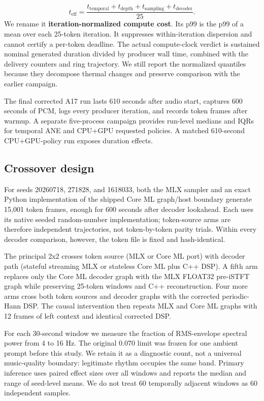 \documentclass[10pt]{article}
\begin{document}
\[t_{\mathrm{eff}} = \frac{t_{\mathrm{temporal}} + t_{\mathrm{depth}} + t_{\mathrm{sampling}} + t_{\mathrm{decoder}}}{25}.\]
We rename it \textbf{iteration-normalized compute cost}. Its p99 is the p99 of a mean over each 25-token iteration. It suppresses within-iteration dispersion and cannot certify a per-token deadline. The actual compute-clock verdict is sustained nominal generated duration divided by producer wall time, combined with the delivery counters and ring trajectory. We still report the normalized quantiles because they decompose thermal changes and preserve comparison with the earlier campaign.

The final corrected A17 run lasts 610 seconds after audio start, captures 600 seconds of PCM, logs every producer iteration, and records token frames after warmup. A separate five-process campaign provides run-level medians and IQRs for temporal ANE and CPU+GPU requested policies. A matched 610-second CPU+GPU-policy run exposes duration effects.

\subsection{Crossover design}
For seeds 20260718, 271828, and 1618033, both the MLX sampler and an exact Python implementation of the shipped Core ML graph/host boundary generate 15,001 token frames, enough for 600 seconds after decoder lookahead. Each uses its native seeded random-number implementation; token-source arms are therefore independent trajectories, not token-by-token parity trials. Within every decoder comparison, however, the token file is fixed and hash-identical.

The principal 2x2 crosses token source (MLX or Core ML port) with decoder path (stateful streaming MLX or stateless Core ML plus C++ DSP). A fifth arm replaces only the Core ML decoder graph with the MLX FLOAT32 pre-iSTFT graph while preserving 25-token windows and C++ reconstruction. Four more arms cross both token sources and decoder graphs with the corrected periodic-Hann DSP. The causal intervention then repeats MLX and Core ML graphs with 12 frames of left context and identical corrected DSP.

For each 30-second window we measure the fraction of RMS-envelope spectral power from 4 to 16 Hz. The original 0.070 limit was frozen for one ambient prompt before this study. We retain it as a diagnostic count, not a universal music-quality boundary: legitimate rhythm occupies the same band. Primary inference uses paired effect sizes over all windows and reports the median and range of seed-level means. We do not treat 60 temporally adjacent windows as 60 independent samples.
\end{document}
